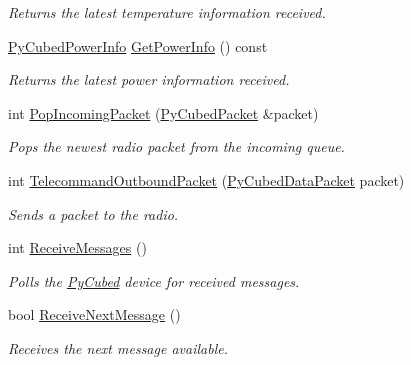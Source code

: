 \begin{DoxyCompactItemize}
\begin{DoxyCompactList}\small\item\em Returns the latest temperature information received. \end{DoxyCompactList}\item 
\hyperlink{structcubesat_1_1PyCubedPowerInfo}{Py\+Cubed\+Power\+Info} \hyperlink{classcubesat_1_1PyCubed_ae934c1fb36fbf3865ee884401dc11aaa}{Get\+Power\+Info} () const
\begin{DoxyCompactList}\small\item\em Returns the latest power information received. \end{DoxyCompactList}\item 
int \hyperlink{classcubesat_1_1PyCubed_a60887bc5d94a8f58ac1d59db50397268}{Pop\+Incoming\+Packet} (\hyperlink{structcubesat_1_1PyCubedPacket}{Py\+Cubed\+Packet} \&packet)
\begin{DoxyCompactList}\small\item\em Pops the newest radio packet from the incoming queue. \end{DoxyCompactList}\item 
int \hyperlink{classcubesat_1_1PyCubed_ab662a7193869909f84e7f61abff835d4}{Telecommand\+Outbound\+Packet} (\hyperlink{structcubesat_1_1PyCubedDataPacket}{Py\+Cubed\+Data\+Packet} packet)
\begin{DoxyCompactList}\small\item\em Sends a packet to the radio. \end{DoxyCompactList}\item 
int \hyperlink{classcubesat_1_1PyCubed_a1f9dcecafbef5dc0b285aa34c7e6a81c}{Receive\+Messages} ()
\begin{DoxyCompactList}\small\item\em Polls the \hyperlink{classcubesat_1_1PyCubed}{Py\+Cubed} device for received messages. \end{DoxyCompactList}\item 
bool \hyperlink{classcubesat_1_1PyCubed_a1a112a9d5f28f5a5cf1be27cd12d3cda}{Receive\+Next\+Message} ()
\begin{DoxyCompactList}\small\item\em Receives the next message available. \end{DoxyCompactList}\end{DoxyCompactItemize}
